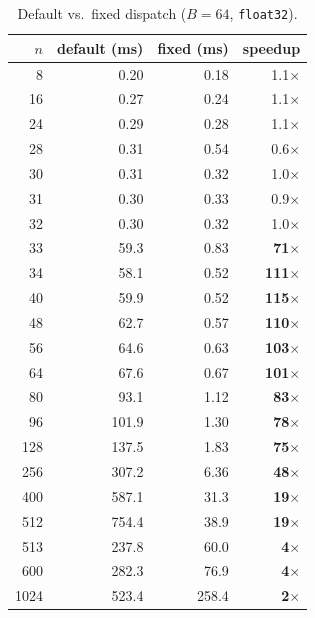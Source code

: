 \documentclass[10pt, letterpaper]{article}
\begin{document}
\begin{table}[h]
\centering
\caption{Default vs.\ fixed dispatch ($B = 64$, \texttt{float32}).}
\label{tab:f32_B64}
\begin{tabular}{r rrr}
\toprule
$n$ & default (ms) & fixed (ms) & speedup \\
\midrule
     8  &    0.20 &    0.18 & 1.1$\times$ \\
    16  &    0.27 &    0.24 & 1.1$\times$ \\
    24  &    0.29 &    0.28 & 1.1$\times$ \\
    28  &    0.31 &    0.54 & 0.6$\times$ \\
    30  &    0.31 &    0.32 & 1.0$\times$ \\
    31  &    0.30 &    0.33 & 0.9$\times$ \\
    32  &    0.30 &    0.32 & 1.0$\times$ \\
\midrule
    33  &    59.3 &    0.83 & \textbf{71$\times$} \\
    34  &    58.1 &    0.52 & \textbf{111$\times$} \\
    40  &    59.9 &    0.52 & \textbf{115$\times$} \\
    48  &    62.7 &    0.57 & \textbf{110$\times$} \\
    56  &    64.6 &    0.63 & \textbf{103$\times$} \\
    64  &    67.6 &    0.67 & \textbf{101$\times$} \\
    80  &    93.1 &    1.12 & \textbf{83$\times$} \\
    96  &   101.9 &    1.30 & \textbf{78$\times$} \\
   128  &   137.5 &    1.83 & \textbf{75$\times$} \\
   256  &   307.2 &    6.36 & \textbf{48$\times$} \\
   400  &   587.1 &    31.3 & \textbf{19$\times$} \\
   512  &   754.4 &    38.9 & \textbf{19$\times$} \\
   513  &   237.8 &    60.0 & \textbf{4$\times$} \\
   600  &   282.3 &    76.9 & \textbf{4$\times$} \\
  1024  &   523.4 &   258.4 & \textbf{2$\times$} \\
\bottomrule
\end{tabular}
\end{table}
\end{document}
